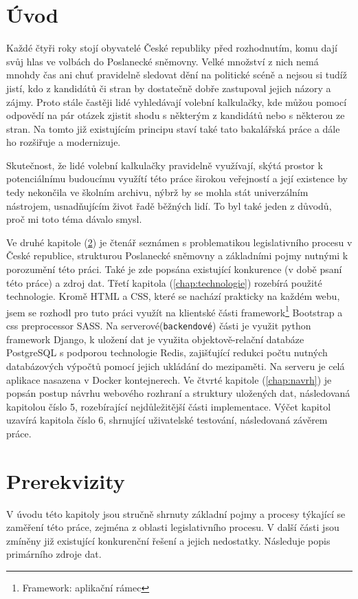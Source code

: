 
\chapter{Úvod}
Každé čtyři roky stojí obyvatelé České republiky před rozhodnutím, komu dají svůj hlas ve volbách do Poslanecké sněmovny. Velké množství z nich nemá mnohdy čas ani chuť pravidelně sledovat dění na politické scéně a nejsou si tudíž jistí, kdo z kandidátů či stran by dostatečně dobře zastupoval jejich názory a zájmy. Proto stále častěji lidé vyhledávají volební kalkulačky, kde můžou pomocí odpovědí na pár otázek zjistit shodu s některým z kandidátů nebo s některou ze stran. Na tomto již existujícím principu staví také tato bakalářská práce a dále ho rozšiřuje a modernizuje. 
\par Skutečnost, že lidé volební kalkulačky pravidelně využívají, skýtá prostor k potenciálnímu budoucímu využítí této práce širokou veřejností a její existence by tedy nekončila ve školním archivu, nýbrž by se mohla stát univerzálním nástrojem, usnadňujícím život řadě běžných lidí. To byl také jeden z důvodů, proč mi toto téma dávalo smysl.
\par Ve druhé kapitole (\ref{chap:Prerekvizity}) je čtenář seznámen s problematikou legislativního procesu v České republice, strukturou Poslanecké sněmovny a základními pojmy nutnými k porozumění této práci. Také je zde popsána existující konkurence (v době psaní této práce) a zdroj dat. Třetí kapitola (\ref{chap:technologie}) rozebírá použité technologie. Kromě HTML a CSS, které se nachází prakticky na každém webu, jsem se rozhodl pro tuto práci využít na klientské části framework\footnote{Framework: aplikační rámec} Bootstrap a css preprocessor SASS. Na serverové(\texttt{backendové}) části je využit python framework Django, k uložení dat je využita objektově-relační databáze PostgreSQL s podporou technologie Redis, zajišťující redukci počtu nutných databázových výpočtů pomocí jejich ukládání do mezipaměti. Na serveru je celá aplikace nasazena v Docker kontejnerech.  Ve čtvrté kapitole (\ref{chap:navrh}) je popsán postup návrhu webového rozhraní a struktury uložených dat, následovaná kapitolou číslo 5, rozebírající nejdůležitější části implementace. Výčet kapitol uzavírá kapitola číslo 6, shrnující uživatelské testování, následovaná závěrem práce.



\chapter{Prerekvizity}
\label{chap:Prerekvizity}
V úvodu této kapitoly jsou stručně shrnuty základní pojmy a procesy týkající se zaměření této práce, zejména z oblasti legislativního procesu. V další části jsou zmíněny již existující konkurenční řešení a jejich nedostatky. Následuje popis primárního zdroje dat.


